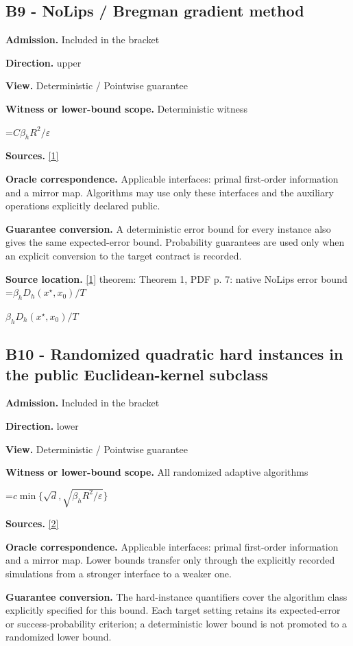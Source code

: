 \documentclass[10pt,a4paper]{article}
\newcommand{\AtlasMath}[1]{\par\begingroup\centering\setbox0=\hbox{$\displaystyle #1$}\ifdim\wd0>1.4\linewidth\typeout{ATLAS WIDE FORMULA: \the\wd0}\fi\ifdim\wd0>\linewidth\resizebox{\linewidth}{!}{\box0}\else\box0\fi\par\endgroup}
\newcommand{\AtlasInlineMath}[1]{\begingroup\setbox0=\hbox{$#1$}\ifdim\wd0>.4\linewidth\endgroup\AtlasMath{#1}\else\endgroup$#1$\fi}
\begin{document}
\subsection{B9 - NoLips / Bregman gradient method}
\textbf{Admission.} Included in the bracket

\textbf{Direction.} upper

\textbf{View.} Deterministic / Pointwise guarantee

\textbf{Witness or lower-bound scope.} Deterministic witness

\AtlasMath{C\beta_hR^2/\varepsilon}
\textbf{Sources.} \href{https://arxiv.org/pdf/1911.08510v3}{[1]}

\textbf{Oracle correspondence.} Applicable interfaces: primal first-order information and a mirror map. Algorithms may use only these interfaces and the auxiliary operations explicitly declared public.

\textbf{Guarantee conversion.} A deterministic error bound for every instance also gives the same expected-error bound. Probability guarantees are used only when an explicit conversion to the target contract is recorded.

\textbf{Source location.} \href{https://arxiv.org/pdf/1911.08510v3}{[1]} theorem: Theorem 1, PDF p. 7: native NoLips error bound \AtlasInlineMath{\beta_hD_h(x^\star,x_0)/T}

\subsection{B10 - Randomized quadratic hard instances in the public Euclidean-kernel subclass}
\textbf{Admission.} Included in the bracket

\textbf{Direction.} lower

\textbf{View.} Deterministic / Pointwise guarantee

\textbf{Witness or lower-bound scope.} All randomized adaptive algorithms

\AtlasMath{c\min\{\sqrt d,\sqrt{\beta_hR^2/\varepsilon}\}}
\textbf{Sources.} \href{https://arxiv.org/pdf/2609.10874}{[2]}

\textbf{Oracle correspondence.} Applicable interfaces: primal first-order information and a mirror map. Lower bounds transfer only through the explicitly recorded simulations from a stronger interface to a weaker one.

\textbf{Guarantee conversion.} The hard-instance quantifiers cover the algorithm class explicitly specified for this bound. Each target setting retains its expected-error or success-probability criterion; a deterministic lower bound is not promoted to a randomized lower bound.
\end{document}
